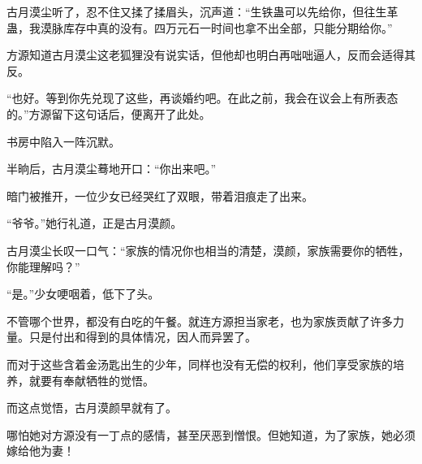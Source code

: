 \begin{this_body}
古月漠尘听了，忍不住又揉了揉眉头，沉声道：“生铁蛊可以先给你，但往生革蛊，我漠脉库存中真的没有。四万元石一时间也拿不出全部，只能分期给你。”

方源知道古月漠尘这老狐狸没有说实话，但他却也明白再咄咄逼人，反而会适得其反。

“也好。等到你先兑现了这些，再谈婚约吧。在此之前，我会在议会上有所表态的。”方源留下这句话后，便离开了此处。

书房中陷入一阵沉默。

半晌后，古月漠尘蓦地开口：“你出来吧。”

暗门被推开，一位少女已经哭红了双眼，带着泪痕走了出来。

“爷爷。”她行礼道，正是古月漠颜。

古月漠尘长叹一口气：“家族的情况你也相当的清楚，漠颜，家族需要你的牺牲，你能理解吗？”

“是。”少女哽咽着，低下了头。

不管哪个世界，都没有白吃的午餐。就连方源担当家老，也为家族贡献了许多力量。只是付出和得到的具体情况，因人而异罢了。

而对于这些含着金汤匙出生的少年，同样也没有无偿的权利，他们享受家族的培养，就要有奉献牺牲的觉悟。

而这点觉悟，古月漠颜早就有了。

哪怕她对方源没有一丁点的感情，甚至厌恶到憎恨。但她知道，为了家族，她必须嫁给他为妻！

\end{this_body}


